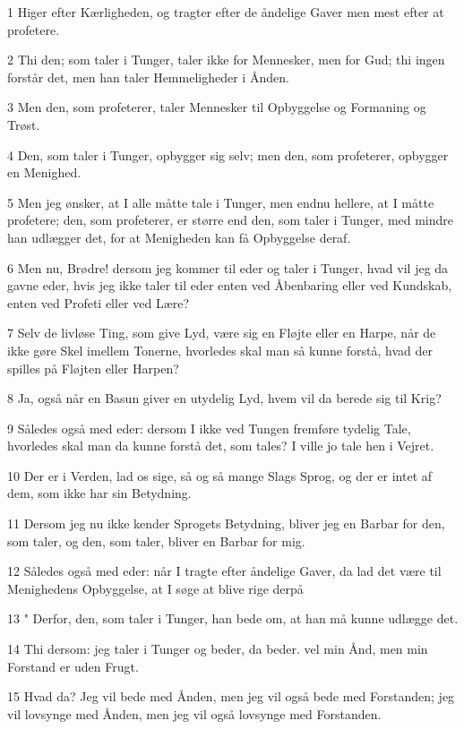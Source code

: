 \par 1 Higer efter Kærligheden, og tragter efter de åndelige Gaver men mest efter at profetere.
\par 2 Thi den; som taler i Tunger, taler ikke for Mennesker, men for Gud; thi ingen forstår det, men han taler Hemmeligheder i Ånden.
\par 3 Men den, som profeterer, taler Mennesker til Opbyggelse og Formaning og Trøst.
\par 4 Den, som taler i Tunger, opbygger sig selv; men den, som profeterer, opbygger en Menighed.
\par 5 Men jeg ønsker, at I alle måtte tale i Tunger, men endnu hellere, at I måtte profetere; den, som profeterer, er større end den, som taler i Tunger, med mindre han udlægger det, for at Menigheden kan få Opbyggelse deraf.
\par 6 Men nu, Brødre! dersom jeg kommer til eder og taler i Tunger, hvad vil jeg da gavne eder, hvis jeg ikke taler til eder enten ved Åbenbaring eller ved Kundskab, enten ved Profeti eller ved Lære?
\par 7 Selv de livløse Ting, som give Lyd, være sig en Fløjte eller en Harpe, når de ikke gøre Skel imellem Tonerne, hvorledes skal man så kunne forstå, hvad der spilles på Fløjten eller Harpen?
\par 8 Ja, også når en Basun giver en utydelig Lyd, hvem vil da berede sig til Krig?
\par 9 Således også med eder: dersom I ikke ved Tungen fremføre tydelig Tale, hvorledes skal man da kunne forstå det, som tales? I ville jo tale hen i Vejret.
\par 10 Der er i Verden, lad os sige, så og så mange Slags Sprog, og der er intet af dem, som ikke har sin Betydning.
\par 11 Dersom jeg nu ikke kender Sprogets Betydning, bliver jeg en Barbar for den, som taler, og den, som taler, bliver en Barbar for mig.
\par 12 Således også med eder: når I tragte efter åndelige Gaver, da lad det være til Menighedens Opbyggelse, at I søge at blive rige derpå
\par 13 " Derfor, den, som taler i Tunger, han bede om, at han må kunne udlægge det.
\par 14 Thi dersom: jeg taler i Tunger og beder, da beder. vel min Ånd, men min Forstand er uden Frugt.
\par 15 Hvad da? Jeg vil bede med Ånden, men jeg vil også bede med Forstanden; jeg vil lovsynge med Ånden, men jeg vil også lovsynge med Forstanden.
